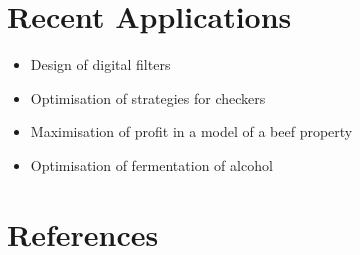 \documentclass[A4, twocolumn]{article}
\begin{document}
	\section{\textbf{Recent Applications}}
	
	\begin{itemize}
		\item Design of digital filters
		\item Optimisation of strategies for checkers
		\item Maximisation of profit in a model of a beef property
		\item Optimisation of fermentation of alcohol
	\end{itemize}

	
	
	\section{\textbf{References}}
\end{document}
